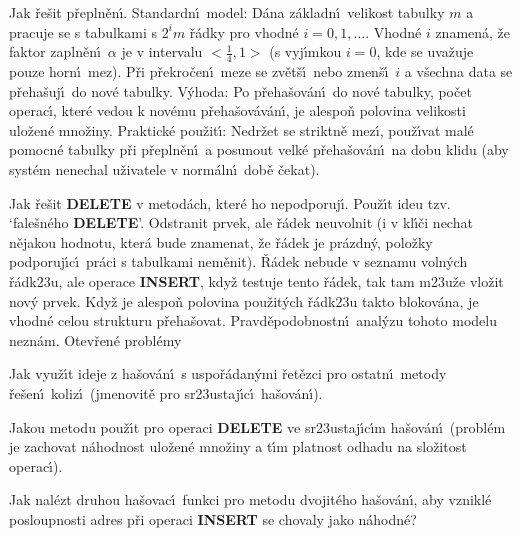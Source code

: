 \flushpar Jak \v re\v sit p\v repln\v en\'\i .\newline 
Standardn\'\i\ model: D\'ana z\'akladn\'\i\ velikost tabulky $m$ a 
pracuje se s tabulkami s $2^im$ \v r\'adky pro vhodn\'e 
$i=0,1,\dots$. Vhodn\'e $i$ znamen\'a, \v ze faktor zapln\v en\'\i\ $
\alpha$ je v 
intervalu $<\frac 14,1>$ (s vyj\'\i mkou $i=0$, kde se uva\v zuje 
pouze horn\'\i\ mez). P\v ri p\v rekro\-\v ce\-n\'\i\ meze se zv\v et\v s\'\i\ nebo 
zmen\v s\'\i\ $i$ a v\v sechna data se p\v reha\v suj\'\i\ do nov\'e 
tabulky.\newline 
V\'yhoda: Po p\v reha\v sov\'an\'\i\ do nov\'e tabulky, po\v cet operac\'\i , 
kter\'e vedou k nov\'emu p\v reha\v sov\'a\-v\'a\-n\'\i , je alespo\v n polovina 
velikosti ulo\v zen\'e mno\v ziny.\newline 
Praktick\'e pou\v zit\'\i : Nedr\v zet se striktn\v e mez\'\i , pou\v z\'\i vat 
mal\'e pomocn\'e ta\-bul\-ky p\v ri p\v repln\v en\'\i\ a posunout velk\'e 
p\v reha\v sov\'an\'\i\ na dobu klidu (aby syst\'em nenechal u\v zivatele v 
norm\'aln\'\i\ dob\v e \v cekat).
\medskip

\flushpar Jak \v re\v sit {\bf DELETE} v metod\'ach, kter\'e ho 
nepodporuj\'\i .\newline 
Pou\v z\'\i t ideu tzv. `fale\v sn\'eho {\bf DELETE}'. 
Odstranit prvek, ale \v r\'adek neuvolnit (i v kl\'\i\v ci nechat 
n\v ejakou hodnotu, kter\'a bude znamenat, \v ze \v r\'adek je 
pr\'azdn\'y, polo\v zky podporuj\'\i c\'\i\ pr\'aci s tabulkami nem\v enit). 
\v R\'adek nebude v seznamu voln\'ych \v r\'adk\accent23u, ale 
operace {\bf INSERT}, kdy\v z testuje tento \v r\'adek, tak tam 
m\accent23u\v ze vlo\v zit nov\'y prvek. Kdy\v z je alespo\v n 
polovina pou\v zit\'ych \v r\'adk\accent23u takto blokov\'ana, je 
vhodn\'e celou strukturu p\v reha\v sovat. Prav\-d\v epodobnostn\'\i\ 
anal\'yzu tohoto modelu nezn\'am.
\medskip
\subhead
Otev\v ren\'e probl\'emy
\endsubhead
\smallskip

\flushpar Jak vyu\v z\'\i t ideje z ha\v sov\'an\'\i\ s uspo\v r\'adan\'ymi 
\v ret\v ezci pro ostatn\'\i\ metody \v re\v sen\'\i\ koliz\'\i\ 
(jmeno\-vit\v e pro sr\accent23ustaj\'\i c\'\i\ ha\v sov\'an\'\i ).
\medskip

\flushpar Jakou metodu pou\v z\'\i t pro operaci {\bf DELETE} ve 
sr\accent23ustaj\'\i c\'\i m ha\v sov\'an\'\i\ (probl\'em je zachovat n\'ahodnost 
ulo\v zen\'e mno\v ziny a t\'\i m platnost odhadu na slo\v zitost operac\'\i ). 
\medskip

\flushpar Jak nal\'ezt druhou ha\v sovac\'\i\ funkci pro metodu 
dvojit\'eho ha\v so\-v\'a\-n\'\i , aby vznikl\'e posloupnosti adres p\v ri operaci 
{\bf INSERT} se chovaly jako n\'ahodn\'e?
\medskip

